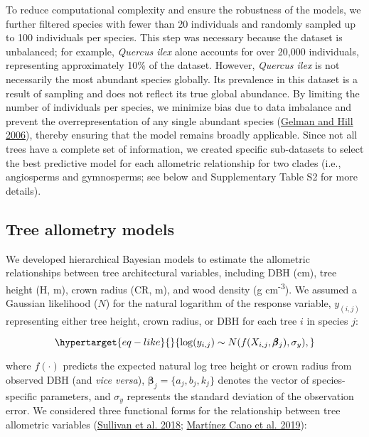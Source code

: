 \documentclass[
  12pt,
  letterpaper,
  DIV=11,
  numbers=noendperiod]{scrartcl}
\begin{document}
To reduce computational complexity and ensure the robustness of the
models, we further filtered species with fewer than 20 individuals and
randomly sampled up to 100 individuals per species. This step was
necessary because the dataset is unbalanced; for example, \emph{Quercus
ilex} alone accounts for over 20,000 individuals, representing
approximately 10\% of the dataset. However, \emph{Quercus ilex} is not
necessarily the most abundant species globally. Its prevalence in this
dataset is a result of sampling and does not reflect its true global
abundance. By limiting the number of individuals per species, we
minimize bias due to data imbalance and prevent the overrepresentation
of any single abundant species
(\protect\hyperlink{ref-Gelman2006}{Gelman and Hill 2006}), thereby
ensuring that the model remains broadly applicable. Since not all trees
have a complete set of information, we created specific sub-datasets to
select the best predictive model for each allometric relationship for
two clades (i.e., angiosperms and gymnosperms; see below and
Supplementary Table S2 for more details).

\hypertarget{tree-allometry-models}{%
\subsection{Tree allometry models}\label{tree-allometry-models}}

We developed hierarchical Bayesian models to estimate the allometric
relationships between tree architectural variables, including DBH (cm),
tree height (H, m), crown radius (CR, m), and wood density (g
cm\textsuperscript{-3}). We assumed a Gaussian likelihood (\(N\)) for
the natural logarithm of the response variable, \(y_{(i,j)}\)
representing either tree height, crown radius, or DBH for each tree
\(i\) in species \(j\):

\begin{equation}\protect\hypertarget{eq-like}{}{
\log(y_{i,j}) \sim N(f(X_{i,j}, \pmb{\beta}_{j}), \sigma_y),
}\label{eq-like}\end{equation}

where \(f(\cdot)\) predicts the expected natural log tree height or
crown radius from observed DBH (and \emph{vice versa}),
\(\pmb{\beta}_{j}=\{a_j, b_j, k_j\}\) denotes the vector of
species-specific parameters, and \(\sigma_y\) represents the standard
deviation of the observation error. We considered three functional forms
for the relationship between tree allometric variables
(\protect\hyperlink{ref-Sullivan2018}{Sullivan et al. 2018};
\protect\hyperlink{ref-MartinezCano2019}{Martínez Cano et al. 2019}):
\end{document}
